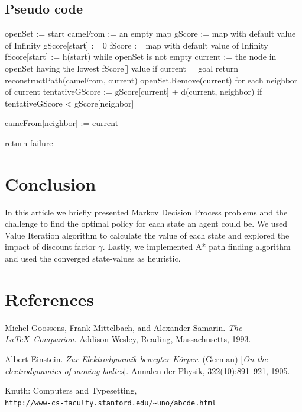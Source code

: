 \documentclass[10pt,a4paper,twocolumn]{article}
\begin{document}
	\subsection{Pseudo code}
	openSet := {start}
	\newline
	cameFrom := an empty map
	\newline
	gScore := map with default value of Infinity
	\newline
	gScore[start] := 0
	\newline
	fScore := map with default value of Infinity
	\newline
	fScore[start] := h(start)
	\newline
	 while openSet is not empty
	\newline
	current := the node in openSet having the lowest fScore[] value
		\newline
	if current = goal
		\newline
	return reconstructPath(cameFrom, current)
		\newline
	openSet.Remove(current)
		\newline
	for each neighbor of current
	\newline
	tentativeGScore := gScore[current] + d(current, neighbor)
		\newline
	if tentativeGScore < gScore[neighbor]
		\newline

	cameFrom[neighbor] := current


	return failure
	
	\section{Conclusion}
	In this article we briefly presented Markov Decision Process problems and the challenge to find the optimal policy for each state an agent could be. We used Value Iteration algorithm to calculate the value of each state and explored the impact of discount factor $\gamma$. Lastly, we implemented A* path finding algorithm and used the converged state-values as heuristic.
	\section{References}
	
	
	\begin{thebibliography}{9}
		Michel Goossens, Frank Mittelbach, and Alexander Samarin. 
		\textit{The \LaTeX\ Companion}. 
		Addison-Wesley, Reading, Massachusetts, 1993.
		
		Albert Einstein. 
		\textit{Zur Elektrodynamik bewegter K{\"o}rper}. (German) 
		[\textit{On the electrodynamics of moving bodies}]. 
		Annalen der Physik, 322(10):891–921, 1905.
		
		Knuth: Computers and Typesetting,
		\\\texttt{http://www-cs-faculty.stanford.edu/\~{}uno/abcde.html}
	\end{thebibliography}
	
\end{document}
